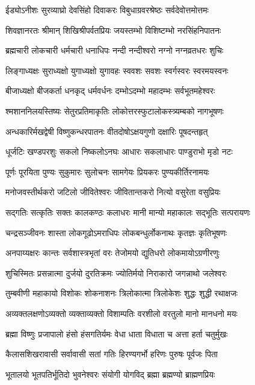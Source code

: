 \twolineshloka
{ईड्योऽनीशः सुरव्याघ्रो देवसिंहो दिवाकरः}
{विबुधाग्रवरश्रेष्ठः सर्वदेवोत्तमोत्तमः}

\twolineshloka
{शिवज्ञानरतः श्रीमान् शिखिश्रीपर्वतप्रियः}
{जयस्तम्भो विशिष्टम्भो नरसिंहनिपातनः}

\twolineshloka
{ब्रह्मचारी लोकचारी धर्मचारी धनाधिपः}
{नन्दी नन्दीश्वरो नग्नो नग्नव्रतधरः शुचिः}

\twolineshloka
{लिङ्गाध्यक्षः सुराध्यक्षो युगाध्यक्षो युगावहः}
{स्ववशः सवशः स्वर्गस्वरः स्वरमयस्वनः}

\twolineshloka
{बीजाध्यक्षो बीजकर्ता धनकृद् धर्मवर्धनः}
{दम्भोऽदम्भो महादम्भः सर्वभूतमहेश्वरः}

\twolineshloka
{श्मशाननिलयस्तिष्यः सेतुरप्रतिमाकृतिः}
{लोकोत्तरस्फुटालोकस्त्र्यम्बको नागभूषणः}

\twolineshloka
{अन्धकारिर्मखद्वेषी विष्णुकन्धरपातनः}
{वीतदोषोऽक्षयगुणो दक्षारिः पूषदन्तहृत्}

\twolineshloka
{धूर्जटिः खण्डपरशुः सकलो निष्कलोऽनघः}
{आधारः सकलाधारः पाण्डुराभो मृडो नटः}

\twolineshloka
{पूर्णः पूरयिता पुण्यः सुकुमारः सुलोचनः}
{सामगेयः प्रियकरः पुण्यकीर्तिरनामयः}

\twolineshloka
{मनोजवस्तीर्थकरो जटिलो जीवितेश्वरः}
{जीवितान्तकरो नित्यो वसुरेता वसुप्रियः}

\twolineshloka
{सद्गतिः सत्कृतिः सक्तः कालकण्ठः कलाधरः}
{मानी मान्यो महाकालः सद्भूतिः सत्परायणः}

\twolineshloka
{चन्द्रसञ्जीवनः शास्ता लोकगूढोऽमराधिपः}
{लोकबन्धुर्लोकनाथः कृतज्ञः कृतिभूषणः}

\twolineshloka
{अनपाय्यक्षरः कान्तः सर्वशास्त्रभृतां वरः}
{तेजोमयो द्युतिधरो लोकमायोऽग्रणीरणुः}

\twolineshloka
{शुचिस्मितः प्रसन्नात्मा दुर्जयो दुरतिक्रमः}
{ज्योतिर्मयो निराकारो जगन्नाथो जलेश्वरः}

\twolineshloka
{तुम्बवीणी महाकायो विशोकः शोकनाशनः}
{त्रिलोकात्मा त्रिलोकेशः शुद्धः शुद्धी रथाक्षजः}

\twolineshloka
{अव्यक्तलक्षणोऽव्यक्तो व्यक्ताव्यक्तो विशाम्पतिः}
{वरशीलो वरतुलो मानो मानधनो मयः}

\twolineshloka
{ब्रह्मा विष्णुः प्रजापालो हंसो हंसगतिर्यमः}
{वेधा धाता विधाता च अत्ता हर्ता चतुर्मुखः}

\twolineshloka
{कैलासशिखरावासी सर्वावासी सतां गतिः}
{हिरण्यगर्भो हरिणः पुरुषः पूर्वजः पिता}

\twolineshloka
{भूतालयो भूतपतिर्भूतिदो भुवनेश्वरः}
{संयोगी योगविद् ब्रह्मा ब्रह्मण्यो ब्राह्मणप्रियः}

